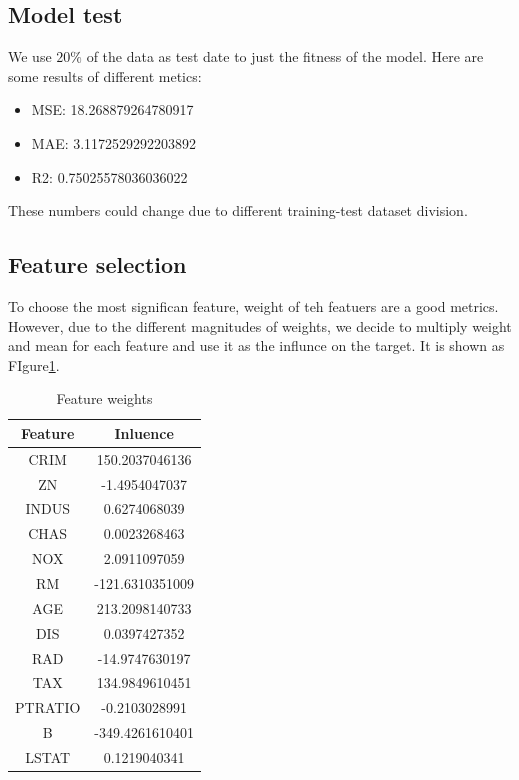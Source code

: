 \documentclass[a4paper]{article}
\begin{document}
\subsection{Model test}
We use $20\%$ of the data as test date to just the fitness of the model. Here are some results of different metics:

\begin{itemize}
    \item MSE: 18.268879264780917
    \item MAE: 3.1172529292203892
    \item R2: 0.75025578036036022
\end{itemize}

These numbers could change due to different training-test dataset division.

\subsection{Feature selection}

To choose the most significan feature, weight of teh featuers are a good metrics. However, due to the different magnitudes of weights, we decide to multiply weight and mean for each feature and use it as the influnce on the target. It is shown as FIgure\ref{tab: Feature influence}.

\begin{table}[htbp]
\centering
\begin{tabular}{|c|c|}
    \hline
    Feature & Inluence\\
    \hline
    CRIM & 150.2037046136\\
    \hline
    ZN & -1.4954047037\\
    \hline
    INDUS & 0.6274068039\\
    \hline
    CHAS & 0.0023268463\\
    \hline
    NOX & 2.0911097059\\
    \hline
    RM & -121.6310351009\\
    \hline
    AGE & 213.2098140733\\
    \hline
    DIS & 0.0397427352\\
    \hline
    RAD & -14.9747630197\\
    \hline
    TAX & 134.9849610451\\
    \hline
    PTRATIO & -0.2103028991\\
    \hline
    B & -349.4261610401\\
    \hline
    LSTAT & 0.1219040341\\
    \hline
    \end{tabular}
\caption{Feature weights}
\label{tab: Feature influence}
\end{table}
\end{document}
